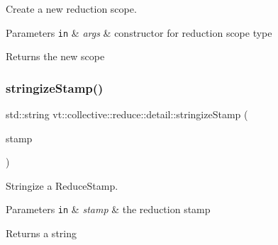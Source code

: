 Create a new reduction scope. 


\begin{DoxyParams}[1]{Parameters}
\mbox{\tt in}  & {\em args} & constructor for reduction scope type\\
\hline
\end{DoxyParams}
\begin{DoxyReturn}{Returns}
the new scope 
\end{DoxyReturn}
\mbox{\label{namespacevt_1_1collective_1_1reduce_1_1detail_a8c155fd8428161395debd8dc0710f583}} 
\subsubsection{\texorpdfstring{stringize\+Stamp()}{stringizeStamp()}}
{\footnotesize\ttfamily std\+::string vt\+::collective\+::reduce\+::detail\+::stringize\+Stamp (\begin{DoxyParamCaption}\item[{\hyperlink{namespacevt_1_1collective_1_1reduce_1_1detail_aacc1fcd729d934ba143fee3a943bf9e7}{Reduce\+Stamp} const \&}]{stamp }\end{DoxyParamCaption})\hspace{0.3cm}{\ttfamily [inline]}}



Stringize a {\ttfamily Reduce\+Stamp}. 


\begin{DoxyParams}[1]{Parameters}
\mbox{\tt in}  & {\em stamp} & the reduction stamp\\
\hline
\end{DoxyParams}
\begin{DoxyReturn}{Returns}
a string 
\end{DoxyReturn}
